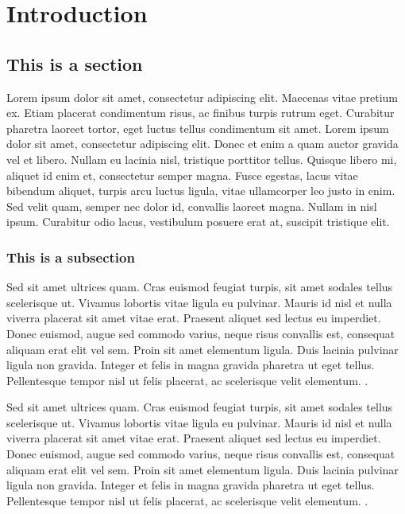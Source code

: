 \chapter{Introduction}

\section{This is a section}

Lorem ipsum dolor sit amet, consectetur adipiscing elit. Maecenas vitae pretium ex. Etiam placerat condimentum risus, ac finibus turpis rutrum eget. Curabitur pharetra laoreet tortor, eget luctus tellus condimentum sit amet. Lorem ipsum dolor sit amet, consectetur adipiscing elit. Donec et enim a quam auctor gravida vel et libero. Nullam eu lacinia nisl, tristique porttitor tellus. Quisque libero mi, aliquet id enim et, consectetur semper magna. Fusce egestas, lacus vitae bibendum aliquet, turpis arcu luctus ligula, vitae ullamcorper leo justo in enim. Sed velit quam, semper nec dolor id, convallis laoreet magna. Nullam in nisl ipsum. Curabitur odio lacus, vestibulum posuere erat at, suscipit tristique elit.

\subsection{This is a subsection}

Sed sit amet ultrices quam. Cras euismod feugiat turpis, sit amet sodales tellus scelerisque ut. Vivamus lobortis vitae ligula eu pulvinar. Mauris id nisl et nulla viverra placerat sit amet vitae erat. Praesent aliquet sed lectus eu imperdiet. Donec euismod, augue sed commodo varius, neque risus convallis est, consequat aliquam erat elit vel sem. Proin sit amet elementum ligula. Duis lacinia pulvinar ligula non gravida. Integer et felis in magna gravida pharetra ut eget tellus. Pellentesque tempor nisl ut felis placerat, ac scelerisque velit elementum. \cite{example2023}.

Sed sit amet ultrices quam. Cras euismod feugiat turpis, sit amet sodales tellus scelerisque ut. Vivamus lobortis vitae ligula eu pulvinar. Mauris id nisl et nulla viverra placerat sit amet vitae erat. Praesent aliquet sed lectus eu imperdiet. Donec euismod, augue sed commodo varius, neque risus convallis est, consequat aliquam erat elit vel sem. Proin sit amet elementum ligula. Duis lacinia pulvinar ligula non gravida. Integer et felis in magna gravida pharetra ut eget tellus. Pellentesque tempor nisl ut felis placerat, ac scelerisque velit elementum. \parencite{sample2022}.